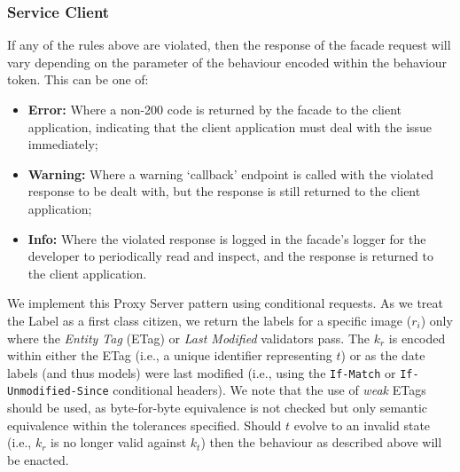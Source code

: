 

\subsubsection{Service Client}

If any of the rules above are violated, then the response of the facade request will vary depending on the parameter of the behaviour encoded within the behaviour token. This can be one of:

\begin{itemize}
    \item \textbf{Error:} Where a  non-200 code is returned by the facade to the client application, indicating that the client application must deal with the issue immediately;
    \item \textbf{Warning:} Where a warning `callback' endpoint is called with the violated response to be dealt with, but the response is still returned to the client application;
    \item \textbf{Info:} Where the violated response is logged in the facade's logger for the developer to periodically read and inspect, and the response is returned to the client application.
\end{itemize}

We implement this Proxy Server pattern using  conditional requests. As we treat the Label as a first class citizen, we return the labels for a specific image ($r_{i}$) only where the \textit{Entity Tag} (ETag) or \textit{Last Modified} validators pass. The $k_{r}$ is encoded within either the ETag (i.e., a unique identifier representing $t$) or as the date labels (and thus models) were last modified (i.e., using the \texttt{If-Match} or \texttt{If-Unmodified-Since} conditional headers). We note that the use of \textit{weak} ETags should be used, as byte-for-byte equivalence is not checked but only semantic equivalence within the tolerances specified. Should $t$ evolve to an invalid state (i.e., $k_{r}$ is no longer valid against $k_{t}$) then the behaviour as described above will be enacted.


